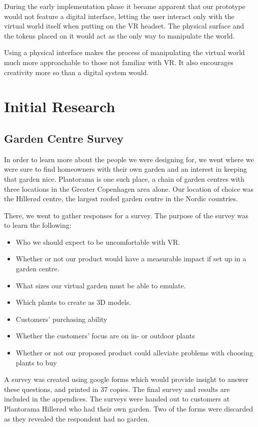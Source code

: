 During the early implementation phase it became apparent that our prototype would not feature a digital interface, letting the user interact only with the virtual world itself when putting on the VR headset. The physical surface and the tokens placed on it would act as the only way to manipulate the world.

Using a physical interface makes the process of manipulating the virtual world much more approachable to those not familiar with VR. It also encourages creativity more so than a digital system would. 




\section{Initial Research}
\subsection{Garden Centre Survey}

In order to learn more about the people we were designing for, we went where we were sure to find homeowners with their own garden and an interest in keeping that garden nice. Plantorama is one such place, a chain of garden centres with three locations in the Greater Copenhagen area alone. Our location of choice was the Hillerød centre, the largest roofed garden centre in the Nordic countries. 

There, we went to gather responses for a survey. 
The purpose of the survey was to learn the following:

\begin{itemize}
	\item Who we should expect to be uncomfortable with VR.
	\item Whether or not our product would have a measurable impact if set up in a garden centre.
	\item What sizes our virtual garden must be able to emulate.
	\item Which plants to create as 3D models.
	\item Customers' purchasing ability
	\item Whether the customers' focus are on in- or outdoor plants
	\item Whether or not our proposed product could alleviate problems with choosing plants to buy
\end{itemize}
A survey was created using google forms which would provide insight to answer these questions, and printed in 37 copies. The final survey and results are included in the appendices. The surveys were handed out to customers at Plantorama Hillerød who had their own garden. Two of the forms were discarded as they revealed the respondent had no garden. %

